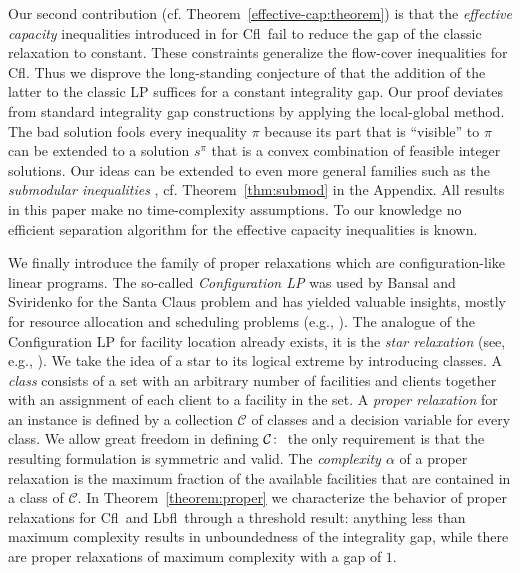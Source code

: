 \documentclass[11pt]{article}
\newcommand{\lbfl}{{\sc Lbfl}}
\newcommand{\cfl}{{\sc Cfl}}
\begin{document}
Our second contribution (cf. Theorem~\ref{effective-cap:theorem})
is that the \emph{effective capacity}
inequalities introduced in \cite{AardalPW95,AardalPW95er} for \cfl\ 
fail to reduce the gap of the classic relaxation to constant. 
These constraints generalize the flow-cover inequalities for
\cfl. Thus  we disprove the long-standing conjecture of \cite{LeviSS12} 
that the addition of the latter to the classic LP 
suffices for  a constant integrality gap. 
Our proof deviates from standard integrality gap constructions 
by applying the local-global method.  
The bad solution fools every inequality $\pi$  because its part that is
``visible'' to $\pi$ can be extended to a solution $s^{\pi}$ that is a
convex combination of feasible integer solutions. 
Our  ideas can be extended 
to even more general families
such as the  {\em submodular inequalities} \cite{AardalPW95}, cf. 
Theorem~\ref{thm:submod}
in the Appendix. 
All results  in this paper make no time-complexity assumptions. To our
knowledge no efficient separation algorithm for the effective
capacity inequalities is known.

We finally  introduce    
the family of  proper relaxations
which are  configuration-like linear programs.
The so-called \emph{Configuration LP} was  used by 
Bansal and Sviridenko 
\cite{BansalS06} for the Santa Claus problem and has yielded valuable insights, mostly
for resource allocation  and scheduling problems
(e.g., \cite{Svensson12}).
 The analogue of the Configuration
LP for facility location already exists, it is the {\em star
  relaxation} (see, e.g., \cite{JainMMSV03}).
We take the idea of a star  to its logical  extreme by 
introducing  classes. 
A {\em class} consists of a set with an arbitrary number of facilities and clients
together with an assignment of each client to a facility in the set. 
A {\em proper relaxation} for an instance is defined by a collection
$\mathcal{C}$ of classes and a decision variable for every class. 
We allow great freedom in 
defining  ${\cal C}\colon$ 
the only requirement   is that the resulting
formulation is symmetric and valid. 
The {\em complexity $\alpha$} of a proper relaxation is the maximum fraction
 of the 
available facilities that are contained in a class of $\mathcal{C}.$
In Theorem~\ref{theorem:proper}  we 
characterize the  behavior of proper relaxations  
for \cfl\ and \lbfl\ through a threshold result: 
anything less than maximum complexity results in unboundedness of
the integrality gap, while there are
proper relaxations of maximum complexity with a gap of
$1$.
\end{document}
